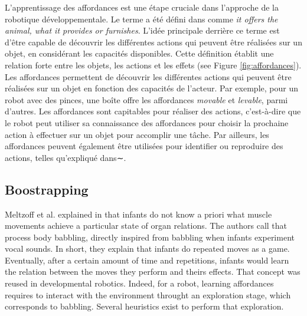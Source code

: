 \documentclass{llncs}
\begin{document}
L'apprentissage des affordances est une étape cruciale dans l'approche de la robotique développementale. Le terme a été défini dans \cite{opac-b1085639} comme \textit{it offers the animal, what it provides or furnishes}. L'idée principale derrière ce terme est d'être capable de découvrir les différentes actions qui peuvent être réalisées sur un objet, en considérant les capacités disponibles. Cette définition établit une relation forte entre les objets, les actions et les effets (see Figure \ref{fig:affordances}). Les affordances permettent de découvrir les différentes actions qui peuvent être réalisées sur un objet en fonction des capacités de l'acteur. Par exemple, pour un robot avec des pinces, une boîte offre les affordances \textit{movable} et \textit{levable}, parmi d'autres. Les affordances sont capitables pour réaliser des actions, c'est-à-dire que le robot peut utiliser sa connaissance des affordances pour choisir la prochaine action à effectuer sur un objet pour accomplir une tâche. Par ailleurs, les affordances peuvent également être utilisées pour identifier ou reproduire des actions, telles qu'expliqué dans∼\cite{4399517}.



\subsection{Boostrapping}
Meltzoff et al. explained in \cite{EDP:EDP157} that infants do not know a priori what muscle movements achieve a particular state of organ relations. The authors call that process body babbling, directly inspired from babbling when infants experiment vocal sounds. In short, they explain that infants do repeated moves as a game. Eventually, after a certain amount of time and repetitions, infants would learn the relation between the moves they perform and theirs effects. That concept was reused in developmental robotics. Indeed, for a robot, learning affordances requires to interact with the environment throught an exploration stage, which corresponds to babbling. Several heuristics exist to perform that exploration.
\end{document}
